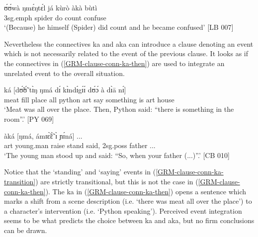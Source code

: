 


\ea\label{GRM-clause-conn-a} 
\gll   ʊ́ʊ́wà  ŋmɛ́ŋtɛ́l   já  kùrò àkà bùtì\\
{\sc 3sg.emph}   spider do count  {\conn}  confuse\\
\glt  `(Because) he himself (Spider) did count and he became confused'
[LB  007]
 \z


Nevertheless the connectives  {\sls ka} and {\sls aka}  can 
introduce a clause denoting an event
which is not necessarily related to the event of the previous clause. It looks
as if  the connectives in (\ref{GRM-clause-conn-ka-then}) are used to
integrate an unrelated event to  the overall situation.   

\ea\label{GRM-clause-conn-ka-then} 
\gll [nànsá sú bárá múŋ̀.] ká [dʊ̃́ʊ̃́ tɪ̀ŋ ŋmá dɪ́ kɪ̀ndɪ́gɪ́ɪ́ 
dʊ́ɔ́ à dɪ̀ā nɪ́]\\
 meat fill place all  {\conn} python {\sc art} say {\comp} something is  {\sc art}
house {\postp}\\
\glt `Meat was all over the place. Then,  Python said: ``there is something in
the room''.' [PY 069]
 \z

\ea\label{GRM-clause-conn-ka-transition} 
\gll  [à  bìpɔ̀lɪ́ɪ́  sìì     tʃɪ́ŋá]  àká   [ŋmá,  
ámɪɛ̃̀ɛ̃̀   ɪ̀      ɲɪ́ná] {...}\\
{\sc art} young.man   raise   stand {\conn} said,  {\adv}   {\sc 2sg.poss} 
father  {...}\\
\glt `The young man stood up and said:  ``So, when your father (...)''.' [CB 010]
 \z

Notice that the `standing' and `saying' events in (\ref{GRM-clause-conn-ka-transition}) are strictly transitional, but this is not the case in (\ref{GRM-clause-conn-ka-then}). The  {\sls ka} in (\ref{GRM-clause-conn-ka-then}) opens a sentence which marks a shift from a scene description (i.e.  `there was meat all over the place') to a character's intervention (i.e. `Python speaking').  Perceived event integration  seems to be what predicts the choice between {\sls ka} and {\sls aka}, but no firm conclusions can be drawn. 


